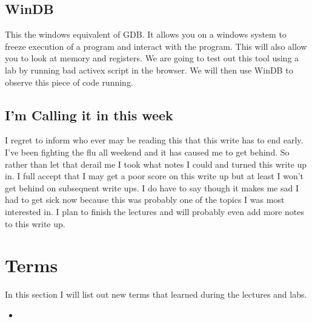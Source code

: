 \documentclass[letterpaper, onecolumn,10pt]{IEEEtran}
\begin{document}
		    \subsection{WinDB}
		    This the windows equivalent of GDB. It allows you on a windows system to freeze execution of a program and interact with the program. This will also allow you to look at memory and registers. We are going to test out this tool using a lab by running bad activex script in the browser. We will then use WinDB to observe this piece of code running.\\
		    
		    \subsection{I'm Calling it in this week}
		    I regret to inform who ever may be reading this that this write has to end early. I've been fighting the flu all weekend and it has caused me to get behind. So rather than let that derail me I took what notes I could and turned this write up in. I full accept that I may get a poor score on this write up but at least I won't get behind on subsequent write ups. I do have to say though it makes me sad I had to get sick now because this was probably one of the topics I was most interested in. I plan to finish the lectures and will probably even add more notes to this write up.\\
		    
		
		
		\section{Terms}
		In this section I will list out new terms that learned during the lectures and labs.
		\begin{itemize}
		    \item 
		\end{itemize}
			
		
\end{document}
